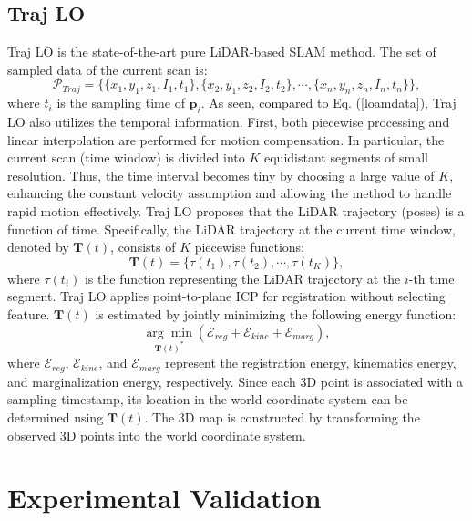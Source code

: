 \subsection{Traj LO}
Traj LO \cite{traj} is the state-of-the-art pure LiDAR-based SLAM method. The set of sampled data of the current scan is:
\begin{equation}
\mathcal{P}_{Traj} = \{ \{x_{1},y_{1},z_{1},I_{1},t_{1}\}, \{x_{2},y_{1},z_{2},I_{2},t_{2}\}, \cdots, \{x_{n},y_{n},z_{n},I_{n},t_{n}\} \},
\end{equation}
where $t_{i}$ is the sampling time of $\mathbf{p}_{i}$. As seen, compared to Eq. (\ref{loamdata}), Traj LO also utilizes the temporal information. First, both piecewise processing and linear interpolation are performed for motion compensation. In particular, the current scan (time window) is divided into $K$ equidistant segments of small resolution. Thus, the time interval becomes tiny by choosing a large value of $K$, enhancing the constant velocity assumption and allowing the method to handle rapid motion effectively. Traj LO proposes that the LiDAR trajectory (poses) is a function of time. Specifically, the LiDAR trajectory at the current time window, denoted by $\mathbf{T}(t)$, consists of $K$ piecewise functions: 
\begin{equation}
\mathbf{T}(t) = \{ \tau(t_{1}), \tau(t_{2}), \cdots, \tau(t_{K})  \},
\end{equation}
where $\tau(t_{i})$ is the function representing the LiDAR trajectory at the $i$-th time segment. Traj LO applies point-to-plane ICP for registration without selecting feature. $\mathbf{T}(t)$ is estimated by jointly minimizing the following energy function:
\begin{equation}
\underset{\mathbf{T}(t)^{*}}{\arg \min } \left( \mathcal{E}_{reg} + \mathcal{E}_{kine} + \mathcal{E}_{marg} \right),
\end{equation}
where $\mathcal{E}_{reg}$, $\mathcal{E}_{kine}$, and $\mathcal{E}_{marg}$ represent the registration energy, kinematics energy, and marginalization energy, respectively. Since each 3D point is associated with a sampling timestamp, its location in the world coordinate system can be determined using $\mathbf{T}(t)$. The 3D map is constructed by transforming the observed 3D points into the world coordinate system.

\section{Experimental Validation} \label{4.4}
